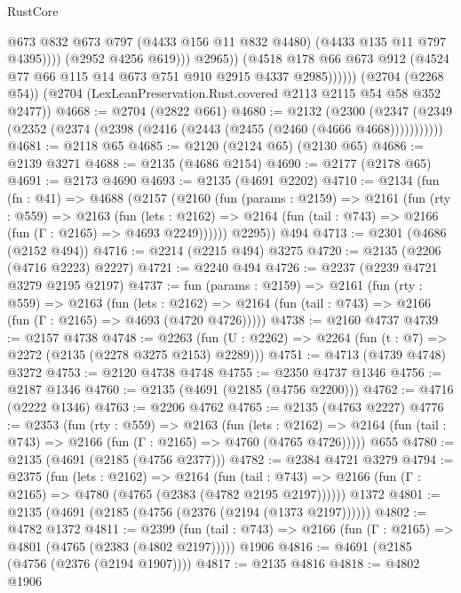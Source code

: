 \begin{lexlean}{RustCore}
\begin{coremodule}
                          @673
                          @832
                          @673
                          @797
                          (@4433 @156 @11 @832 @4480)
                          (@4433 @135 @11 @797 @4395))))
                    (@2952 @4256 @619)))
                @2965))
            (@4518 @178 @66 @673 @912 (@4524 @77 @66 @115 @14 @673 @751 @910 @2915 @4337 @2985))))))
    (@2704 (@2268 @54))
    (@2704 (LexLeanPreservation.Rust.covered @2113 @2115 @54 @58 @352 @2477))
@4668 := @2704 (@2822 @661)
@4680 := @2132
    (@2300 (@2347 (@2349 (@2352 (@2374 (@2398 (@2416 (@2443 (@2455 (@2460 (@4666 @4668)))))))))))
@4681 := @2118 @65
@4685 := @2120 (@2124 @65) (@2130 @65)
@4686 := @2139 @3271
@4688 := @2135 (@4686 @2154)
@4690 := @2177 (@2178 @65)
@4691 := @2173 @4690
@4693 := @2135 (@4691 @2202)
@4710 := @2134
    (fun (fn : @41) =>
    @4688
      (@2157
        (@2160
          (fun (params : @2159) =>
          @2161
            (fun (rty : @559) =>
            @2163
              (fun (lets : @2162) =>
              @2164 (fun (tail : @743) => @2166 (fun (Γ : @2165) => @4693 @2249))))))
        @2295))
    @494
@4713 := @2301 (@4686 (@2152 @494))
@4716 := @2214 (@2215 @494) @3275
@4720 := @2135 (@2206 (@4716 @2223) @2227)
@4721 := @2240 @494
@4726 := @2237 (@2239 @4721 @3279 @2195 @2197)
@4737 := fun (params : @2159) =>
  @2161
    (fun (rty : @559) =>
    @2163
      (fun (lets : @2162) =>
      @2164 (fun (tail : @743) => @2166 (fun (Γ : @2165) => @4693 (@4720 @4726)))))
@4738 := @2160 @4737
@4739 := @2157 @4738
@4748 := @2263 (fun (U : @2262) => @2264 (fun (t : @7) => @2272 (@2135 (@2278 @3275 @2153) @2289)))
@4751 := @4713 (@4739 @4748) @3272
@4753 := @2120 @4738 @4748
@4755 := @2350 @4737 @1346
@4756 := @2187 @1346
@4760 := @2135 (@4691 (@2185 (@4756 @2200)))
@4762 := @4716 (@2222 @1346)
@4763 := @2206 @4762
@4765 := @2135 (@4763 @2227)
@4776 := @2353
    (fun (rty : @559) =>
    @2163
      (fun (lets : @2162) =>
      @2164 (fun (tail : @743) => @2166 (fun (Γ : @2165) => @4760 (@4765 @4726)))))
    @655
@4780 := @2135 (@4691 (@2185 (@4756 @2377)))
@4782 := @2384 @4721 @3279
@4794 := @2375
    (fun (lets : @2162) =>
    @2164
      (fun (tail : @743) => @2166 (fun (Γ : @2165) => @4780 (@4765 (@2383 (@4782 @2195 @2197))))))
    @1372
@4801 := @2135 (@4691 (@2185 (@4756 (@2376 (@2194 (@1373 @2197))))))
@4802 := @4782 @1372
@4811 := @2399
    (fun (tail : @743) => @2166 (fun (Γ : @2165) => @4801 (@4765 (@2383 (@4802 @2197)))))
    @1906
@4816 := @4691 (@2185 (@4756 (@2376 (@2194 @1907))))
@4817 := @2135 @4816
@4818 := @4802 @1906

\end{coremodule}
\end{lexlean}
